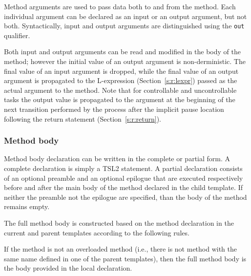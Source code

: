 \documentclass{report}
\newcommand{\src}[1]{\texttt{#1}}
\newcommand{\tsl}{TSL2 }
\begin{document}
Method arguments are used to pass data both to and from the 
method.  Each individual argument can be declared as an input or 
an output argument, but not both.  Syntactically, input and output 
arguments are distinguished using the \src{out} qualifier.

Both input and output arguments can be read and modified in the 
body of the method; however the initial value of an output 
argument is non-derministic.  The final value of an input argument 
is dropped, while the final value of an output argument is 
propagated to the L-expression (Section~\ref{s:r:lexpr}) passed as 
the actual argument to the method.  Note that for controllable and 
uncontrollable tasks the output value is propagated to the 
argument at the beginning of the next transition performed by the 
process after the implicit pause location following the return 
statement (Section~\ref{s:r:return}).

\subsubsection{Method body}

Method body declaration can be written in the complete or partial 
form.  A complete declaration is simply a \tsl statement.  A 
partial declaration consists of an optional preamble and an 
optional epilogue that are executed respectively before and after 
the main body of the method declared in the child template.  If 
neither the preamble not the epilogue are specified, than the body 
of the method remains empty.  

The full method body is constructed based on the method 
declaration in the current and parent templates according to the 
following rules.

If the method is not an overloaded method (i.e., there is not 
method with the same name defined in one of the parent templates), 
then the full method body is the body provided in the local 
declaration.
\end{document}
